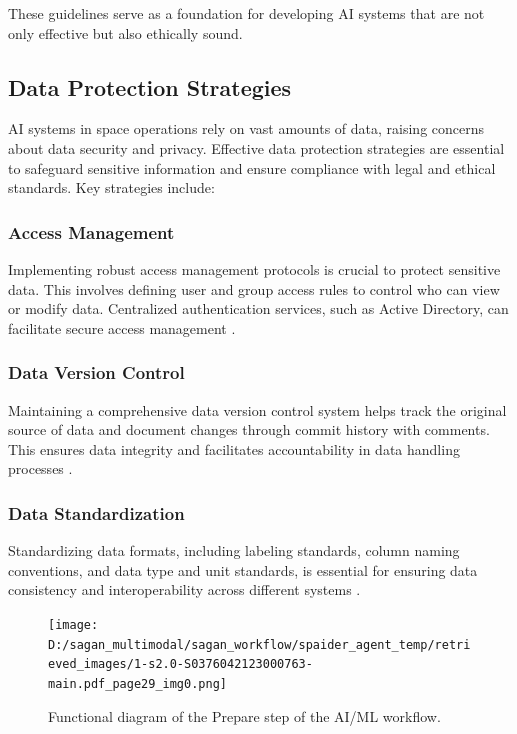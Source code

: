 \documentclass[a4paper, 11pt]{article}
\begin{document}
These guidelines serve as a foundation for developing AI systems that are not only effective but also ethically sound.

\subsection{Data Protection Strategies}

AI systems in space operations rely on vast amounts of data, raising concerns about data security and privacy. Effective data protection strategies are essential to safeguard sensitive information and ensure compliance with legal and ethical standards. Key strategies include:

\subsubsection{Access Management}

Implementing robust access management protocols is crucial to protect sensitive data. This involves defining user and group access rules to control who can view or modify data. Centralized authentication services, such as Active Directory, can facilitate secure access management \cite{data_governance}.

\subsubsection{Data Version Control}

Maintaining a comprehensive data version control system helps track the original source of data and document changes through commit history with comments. This ensures data integrity and facilitates accountability in data handling processes \cite{data_governance}.

\subsubsection{Data Standardization}

Standardizing data formats, including labeling standards, column naming conventions, and data type and unit standards, is essential for ensuring data consistency and interoperability across different systems \cite{data_governance}.

\begin{figure}[htbp]
    \centering
    \texttt{[image: D:/sagan\_multimodal/sagan\_workflow/spaider\_agent\_temp/retrieved\_images/1-s2.0-S0376042123000763-main.pdf\_page29\_img0.png]}
    \caption{Functional diagram of the Prepare step of the AI/ML workflow.}
    \label{fig:ai_ml_workflow}
\end{figure}
\end{document}

